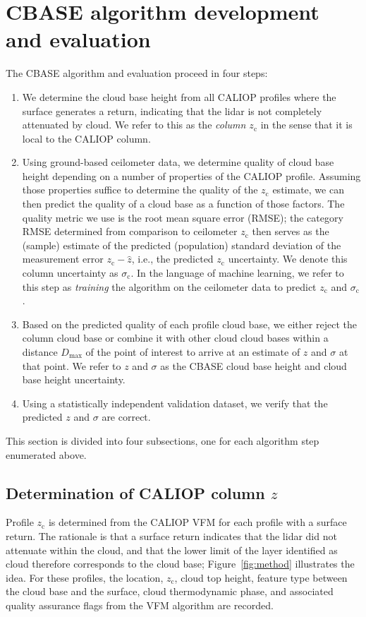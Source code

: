 \documentclass[essd,manuscript]{copernicus}\usepackage[]{graphicx}\usepackage[]{color}
\newcommand\CBH{\ensuremath{z}}
\newcommand\CBHc{\ensuremath{z_\text{c}}}
\newcommand\sigmac{\ensuremath{\sigma_\text{c}}}
\begin{document}
\section{CBASE algorithm development and evaluation}
\label{sec:algorithm}

The CBASE algorithm and evaluation proceed in four steps:
\begin{enumerate}
\item We determine the cloud base height from all CALIOP profiles where the
  surface generates a return, indicating that the lidar is not completely
  attenuated by cloud.  We refer to this as the \textit{column
    \CBHc{}} in the sense that it is local to the CALIOP column.
\item Using ground-based ceilometer data, we determine quality of cloud base
  height depending on a number of properties of the CALIOP profile.  Assuming
  those properties suffice to determine the quality of the \CBHc{} estimate, we
  can then predict the quality of a cloud base as a function of those factors.
  The quality metric we use is the root mean square error (RMSE); the category
  RMSE determined from comparison to ceilometer \CBHc{} then serves as the
  (sample) estimate of the predicted (population) standard deviation of the
  measurement error $\CBHc - \hat{z}$, i.e., the predicted \CBHc{}
  uncertainty.  We denote this column uncertainty as $\sigmac$.  In the language
  of machine learning, we refer to this step 
  as \textit{training} the algorithm on the ceilometer data to predict \CBHc{} and
  $\sigmac$.
\item Based on the predicted quality of each profile cloud base, we either reject
  the column cloud base or combine it with other cloud cloud bases within a
  distance $D_\text{max}$ of the point of interest to arrive at an 
  estimate of \CBH{} and $\sigma$ at that point.  We refer to \CBH{} and $\sigma$
  as the CBASE cloud base height and cloud base height uncertainty.
\item Using a statistically independent validation dataset, we verify that the
  predicted \CBH{} and $\sigma$ are correct.
\end{enumerate}

This section is divided into four subsections, one for each algorithm step
enumerated above.

\subsection{Determination of CALIOP column \CBH{}}
\label{sec:algorithm:local}
Profile \CBHc{} is determined from the CALIOP VFM for each profile with a surface
return.  The rationale is that a surface return indicates that the lidar did not
attenuate within the cloud, and that the lower limit of the layer identified as
cloud therefore corresponds to the cloud base; Figure~\ref{fig:method}
illustrates the idea.  For these profiles, the location, \CBHc{}, cloud top height,
feature type between the cloud base and the surface,
cloud thermodynamic phase, and associated quality assurance flags from the VFM
algorithm are recorded.
\end{document}
